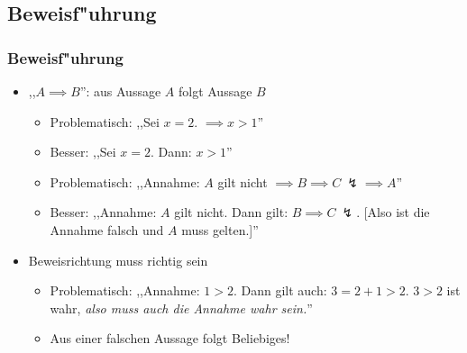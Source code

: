 \subsection{Beweisf"uhrung}
\begin{frame}
  \frametitle{Beweisf"uhrung}
  \begin{itemize}
  \item ,,$A \implies B$'': aus Aussage $A$ folgt Aussage $B$
    \begin{itemize}
    \item Problematisch: ,,Sei $x = 2$. $\implies x > 1$''
    \item Besser: ,,Sei $x = 2$. Dann: $x > 1$'' \\[1em]
    \item Problematisch: ,,Annahme: $A$ gilt nicht
           $\implies B \implies C \ \lightning \implies A$''
    \item Besser: ,,Annahme: $A$ gilt nicht. Dann gilt: $B \implies C \ \lightning$.
          [Also ist die Annahme falsch und $A$ muss gelten.]''
    \end{itemize}
  \item Beweisrichtung muss richtig sein
    \begin{itemize}
    \item Problematisch: ,,Annahme: $1 > 2$. Dann gilt auch:
          $3 = 2 + 1 > 2$. $3 > 2$ ist wahr,
          \emph{also muss auch die Annahme wahr sein.}''
    \item Aus einer falschen Aussage folgt Beliebiges!
    \end{itemize}
  \end{itemize}
\end{frame}

